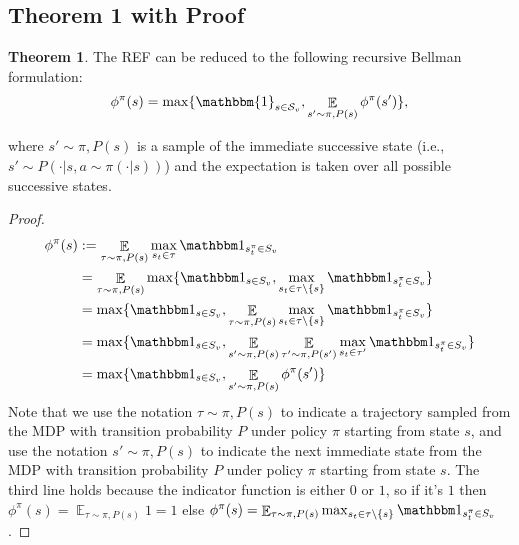 \documentclass{article}
\theoremstyle{definition}
\DeclareMathOperator*{\E}{\mathbb{E}}
\newtheorem{theorem}{Theorem}
\begin{document}
\subsection{Theorem 1 with Proof}
\begin{theorem}
\label{thm:BellmanREFProof}
    The REF can be reduced to the following recursive Bellman formulation:
    \vspace{-3pt}
    \begin{align*}
    \phi^\pi (s) = \max \{ \mathbbm{1}_{s\in \mathcal S_v} , \E_{s' \sim \pi,P(s)} \phi^\pi(s') \},
    \end{align*}
    
    \vspace{-10pt}
    where $s' \sim \pi,P(s)$ is a sample of the immediate successive state (i.e., $s' \sim P(\cdot| s , a\sim \pi(\cdot | s))$) and the expectation is taken over all possible successive states. 
\end{theorem}

\begin{proof}
\begin{align*}
    \phi^\pi(s) &:= \E_{\tau \sim \pi ,P(s)} \max_{s_t \in \tau} \mathbbm 1_{s_t^\pi \in S_v} \\
    &= \E_{\tau \sim \pi ,P(s)} \max\{\mathbbm 1_{s \in S_v}, \max_{s_t \in  \tau \backslash \{s\}} \mathbbm 1_{s_t^\pi \in S_v} \} \\
    &= \max\{\mathbbm 1_{s \in S_v}, \E_{\tau \sim \pi ,P(s)} \max_{s_t \in  \tau \backslash \{s\}} \mathbbm 1_{s_t^\pi \in S_v} \} \\
    &= \max\{\mathbbm 1_{s \in S_v}, \E_{s' \sim \pi ,P(s)} \E_{\tau' \sim \pi ,P(s')} \max_{s_t \in  \tau'} \mathbbm 1_{s_t^\pi \in S_v} \} \\
    &= \max\{\mathbbm 1_{s \in S_v}, \E_{s' \sim \pi ,P(s)} \phi^\pi(s') \} \\
\end{align*}
Note that we use the notation $\tau\sim \pi,P(s)$ to indicate a trajectory sampled from the MDP with transition probability $P$ under policy $\pi$ starting from state $s$, and use the notation $s'\sim \pi,P(s)$ to indicate the next immediate state from the MDP with transition probability $P$ under policy $\pi$ starting from state $s$. The third line holds because the indicator function is either $0$ or $1$, so if it's $1$ then $\phi^\pi(s)=\E_{\tau \sim \pi ,P(s)} 1 = 1$ else $\phi^\pi(s)=\E_{\tau \sim \pi ,P(s)} \max_{s_t \in  \tau \backslash \{s\}} \mathbbm 1_{s_t^\pi \in S_v}$.

\end{proof}
\end{document}

